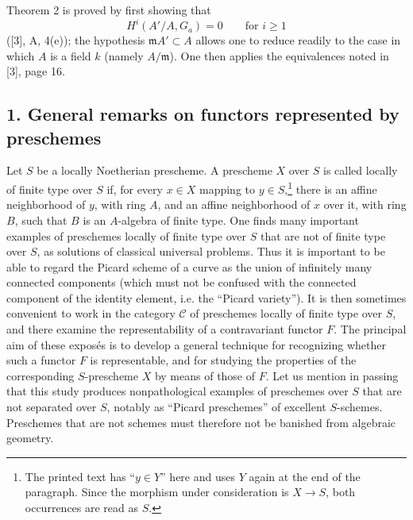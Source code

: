 Theorem 2 is proved by first showing that
\[
  H^i(A'/A,G_a)=0\qquad\text{for }i\geq 1
\]
([3], A, 4(e)); the hypothesis $\mathfrak mA'\subset A$ allows one to reduce
readily to the case in which $A$ is a field $k$ (namely $A/\mathfrak m$). One
then applies the equivalences noted in [3], page 16.


\subsection*{1. General remarks on functors represented by preschemes}

Let $S$ be a locally Noetherian prescheme. A prescheme $X$ over $S$ is called
locally of finite type over $S$ if, for every $x\in X$ mapping to
$y\in S$,\footnote{The printed text has “$y\in Y$” here and uses $Y$ again at
the end of the paragraph. Since the morphism under consideration is
$X\longrightarrow S$, both occurrences are read as $S$.} there is an affine
neighborhood of $y$, with ring $A$, and an affine neighborhood of $x$ over it,
with ring $B$, such that $B$ is an $A$-algebra of finite type. One finds many
important examples of preschemes locally of finite type over $S$ that are not
of finite type over $S$, as solutions of classical universal problems. Thus it
is important to be able to regard the Picard scheme of a curve as the union of
infinitely many connected components (which must not be confused with the
connected component of the identity element, i.e. the “Picard variety”). It is
then sometimes convenient to work in the category $\mathcal C$ of preschemes
locally of finite type over $S$, and there examine the representability of a
contravariant functor $F$. The principal aim of these exposés is to develop a
general technique for recognizing whether such a functor $F$ is representable,
and for studying the properties of the corresponding $S$-prescheme $X$ by
means of those of $F$. Let us mention in passing that this study produces
nonpathological examples of preschemes over $S$ that are not separated over
$S$, notably as “Picard preschemes” of excellent $S$-schemes. Preschemes that
are not schemes must therefore not be banished from algebraic geometry.

